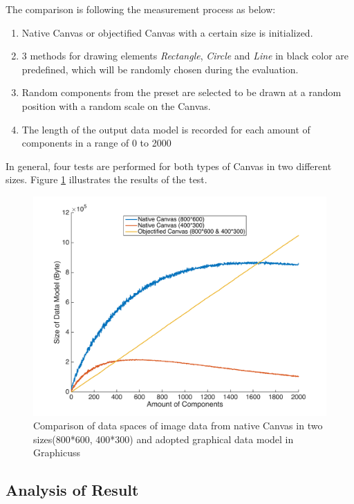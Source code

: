The comparison is following the measurement process as below:

\begin{enumerate}
  \item Native Canvas or objectified Canvas with a certain size is initialized.
  \item 3 methods for drawing elements \textit{Rectangle}, \textit{Circle} and \textit{Line} in black color are predefined, which will be randomly chosen during the evaluation.
  \item Random components from the preset are selected to be drawn at a random position with a random scale on the Canvas.
  \item The length of the output data model is recorded for each amount of components in a range of 0 to 2000
\end{enumerate}

In general, four tests are performed for both types of Canvas in two different sizes. Figure \ref{fig:eval-size} illustrates the results of the test.


\begin{figure}[!htbp]
  \centering
    \includegraphics[width=1\textwidth]{Figures/eval-size.png}
  \caption{Comparison of data spaces of image data from native Canvas in two sizes(800*600, 400*300) and adopted graphical data model in Graphicuss}
  \label{fig:eval-size}
\end{figure}

\subsection{Analysis of Result }

